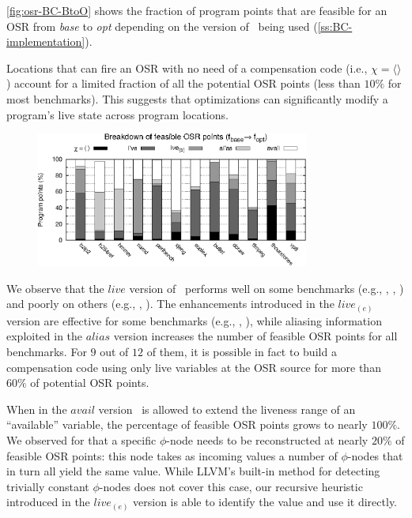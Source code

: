 \myfigure\ref{fig:osr-BC-BtoO} shows the fraction of program points that are feasible for an OSR from {\em base} to {\em opt} depending on the version of \reconstruct\ being used (\mysection\ref{ss:BC-implementation}).

Locations that can fire an OSR with no need of a compensation code (i.e., $\chi=\langle\rangle$) account for a limited fraction of all the potential OSR points (less than $10\%$ for most benchmarks). This suggests that optimizations can significantly modify a program's live state across program locations.

\begin{figure}[!t]
\begin{center}
\includegraphics[width=0.8\textwidth]{figures/osr-BC-BtoO/osr-BC-BtoO.eps}
\caption{\protect}
\end{center}
\end{figure}

We observe that the $live$ version of \reconstruct\ performs well on some benchmarks (e.g., , , ) and poorly on others (e.g., , ). The enhancements introduced in the $live_{(e)}$ version are effective for some benchmarks (e.g., , ), while aliasing information exploited in the $alias$ version increases the number of feasible OSR points for all benchmarks. For $9$ out of $12$ of them, it is possible in fact to build a compensation code using only live variables at the OSR source for more than $60\%$ of potential OSR points.

When in the $avail$ version \reconstruct\ is allowed to extend the liveness range of an ``available'' variable, the percentage of feasible OSR points grows to nearly $100\%$. We observed for  that a specific $\phi$-node needs to be reconstructed at nearly $20\%$ of feasible OSR points: this node takes as incoming values a number of $\phi$-nodes that in turn all yield the same value. While LLVM's built-in method for detecting trivially constant $\phi$-nodes does not cover this case, our recursive heuristic introduced in the $live_{(e)}$ version is able to identify the value and use it directly.

